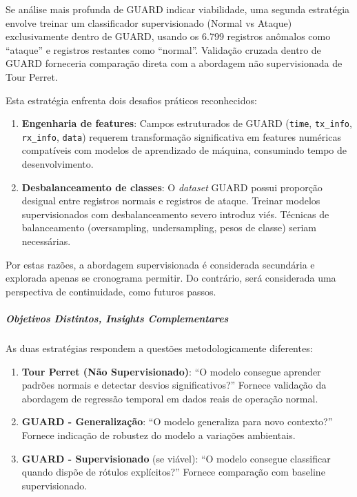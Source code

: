 Se análise mais profunda de GUARD indicar viabilidade, uma segunda 
estratégia envolve treinar um classificador supervisionado (Normal vs 
Ataque) exclusivamente dentro de GUARD, usando os 6.799 registros anômalos 
como ``ataque'' e registros restantes como ``normal''. Validação cruzada 
dentro de GUARD forneceria comparação direta com a abordagem não 
supervisionada de Tour Perret.

Esta estratégia enfrenta dois desafios práticos reconhecidos:

\begin{enumerate}
    \item \textbf{Engenharia de features}: Campos estruturados de GUARD 
    (\texttt{time}, \texttt{tx\_info}, \texttt{rx\_info}, \texttt{data}) 
    requerem transformação significativa em features numéricas compatíveis 
    com modelos de aprendizado de máquina, consumindo tempo de 
    desenvolvimento.
    
    \item \textbf{Desbalanceamento de classes}: O \textit{dataset} GUARD 
    possui proporção desigual entre registros normais e registros de ataque. 
    Treinar modelos supervisionados com desbalanceamento severo introduz 
    viés. Técnicas de balanceamento (oversampling, undersampling, pesos de 
    classe) seriam necessárias.
\end{enumerate}

Por estas razões, a abordagem supervisionada é considerada secundária e 
explorada apenas se cronograma permitir. Do contrário, será considerada uma perspectiva de continuidade, como futuros passos.

\subparagraph{Objetivos Distintos, Insights Complementares}

As duas estratégias respondem a questões metodologicamente diferentes:

\begin{enumerate}
    \item \textbf{Tour Perret (Não Supervisionado)}: ``O modelo consegue 
    aprender padrões normais e detectar desvios significativos?'' Fornece 
    validação da abordagem de regressão temporal em dados reais de operação 
    normal.
    
    \item \textbf{GUARD - Generalização}: ``O modelo generaliza para novo 
    contexto?'' Fornece indicação de robustez do modelo a variações ambientais.
    
    \item \textbf{GUARD - Supervisionado} (se viável): ``O modelo consegue 
    classificar quando dispõe de rótulos explícitos?'' Fornece comparação 
    com baseline supervisionado.
\end{enumerate}


